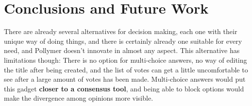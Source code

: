 \section{Conclusions and Future Work}
There are already several alternatives for decision making, each one with their unique way of doing things, and there is certainly already one suitable for every need, and Pollymer doesn't innovate in almost any aspect. This alternative has limitations though: There is no option for multi-choice answers, no way of editing the title after being created, and the list of votes can get a little uncomfortable to see after a large amount of votes has been made. Multi-choice answers would put this gadget \textbf{closer to a consensus tool}, and being able to block options would make the divergence among opinions more visible.
\newpage
